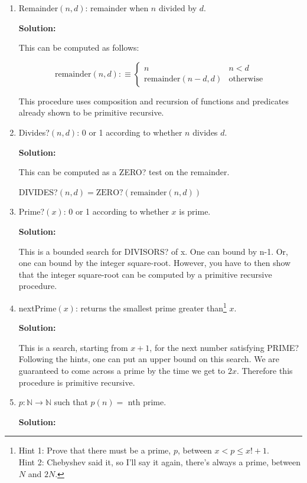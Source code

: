 \documentclass[11pt]{report}
\begin{document}
\begin{enumerate}
		\begin{enumerate}
			\item Remainder$(n,d)$: remainder when $n$ divided by $d$. 
			
			{\bf Solution:}

			This can be computed as follows: 

			$$\text{remainder}(n,d) :\equiv \begin{cases}
				n & n < d \\
				\text{remainder}(n-d,d) & \text{otherwise}
			\end{cases}$$

			This procedure uses composition and recursion of functions and predicates already shown to be primitive recursive. 

			\item Divides?$(n,d)$: 0 or 1 according to whether $n$ divides $d$. 
			
			{\bf Solution:}

			This can be computed as a ZERO? test on the remainder. 

			DIVIDES?$(n,d) = \text{ZERO?}(\text{remainder}(n,d))$

			\item Prime?$(x)$: 0 or 1 according to whether $x$ is prime.  
			
			{\bf Solution:}

			This is a bounded search for DIVISORS? of x. One can bound by n-1. Or, one can bound by the integer square-root. However, you have to then show that the integer square-root can be computed by a primitive recursive procedure. 

			\item nextPrime$(x)$: returns the smallest prime greater than\footnote{Hint 1: Prove that there must be a prime, $p$, between $x < p \leq x! + 1$. \\ Hint 2: Chebyshev said it, so I'll say it again, there's always a prime, between $N$ and $2N$.} $x$.  
			
			{\bf Solution:}

			This is a search, starting from $x+1$, for the next number satisfying PRIME? Following the hints, one can put an upper bound on this search. We are guaranteed to come across a prime by the time we get to $2x$. Therefore this procedure is primitive recursive. 

			\item $p: \mathbb{N} \rightarrow \mathbb{N}$ such that $p(n) = $ nth prime.  
			
			{\bf Solution:}


\end{enumerate}
\end{enumerate}
\end{document}
